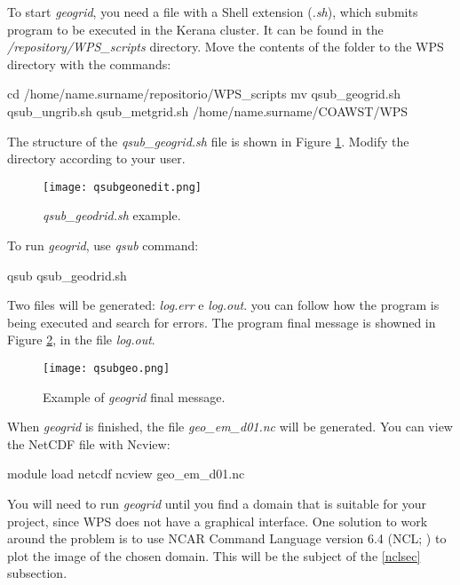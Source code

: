  To start \textit{geogrid}, you need a file with a Shell extension (\textit{.sh}), which submits program to be executed in the Kerana cluster.
 It can be found in the \textit{/repository/WPS\_scripts} directory. Move the contents of the folder to the WPS directory with the commands:
\bigskip

\begin{bashcode}[fontsize=\footnotesize]
cd /home/name.surname/repositorio/WPS_scripts
mv qsub_geogrid.sh qsub_ungrib.sh qsub_metgrid.sh /home/name.surname/COAWST/WPS
\end{bashcode}
\bigskip

 The structure of the \textit{qsub\_geogrid.sh} file is shown in Figure \textcolor{bleu_cite}{\ref{qsubgeonedit}}. 
Modify the directory according to your user.
\bigskip

\begin{figure}[H]
    \centering
    \texttt{[image: qsubgeonedit.png]}
    \caption{\textit{qsub\_geodrid.sh} example.}
    \label{qsubgeonedit}
\end{figure}
\bigskip

 To run \textit{geogrid}, use \textit{qsub} command:
\bigskip

\begin{bashcode}
qsub qsub_geodrid.sh
\end{bashcode}
\bigskip

 Two files will be generated: \textit{log.err} e \textit{log.out}. you can follow how the program is being executed and search for errors. 
The program final message is showned in Figure \textcolor{bleu_cite}{\ref{qsubgeofinal}}, in the file \textit{log.out}.

\bigskip

\begin{figure}[H]
    \centering
    \texttt{[image: qsubgeo.png]}
    \caption{Example of \textit{geogrid} final message.}
    \label{qsubgeofinal}
\end{figure}
\bigskip

 When \textit{geogrid} is finished, the file \textit{geo\_em\_d01.nc} will be generated.
 You can view the NetCDF file with Ncview:
\bigskip

\begin{bashcode}
module load netcdf
ncview geo_em_d01.nc
\end{bashcode}
\bigskip

 You will need to run \textit{geogrid} until you find a domain that is suitable for your project, 
since WPS does not have a graphical interface. One solution to work around the problem is to use NCAR Command Language version 6.4 
(NCL; \cite{Ncl2017}) to plot the image of the chosen domain. This will be the subject of the \textcolor{bleu_cite}{\ref{nclsec}} subsection.


